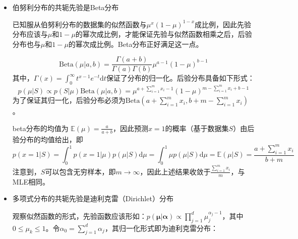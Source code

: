 \documentclass{article}
\begin{document}
	\begin{itemize}
	\item [\textbf{1}] 伯努利分布的共轭先验是Beta分布
	
	\vspace{1mm}
	\begin{scriptsize}
	\begin{spacing}{1.2}
	{\sffamily
	
	已知服从伯努利分布的数据集的似然函数与$\mu^x (1-\mu)^{1-x}$成比例，因此先验分布应该与$\mu$和$1-\mu$的幂次成比例，才能保证先验与似然函数相乘之后，后验分布也与$\mu$和$1-\mu$的幂次成比例。Beta分布正好满足这一点。
	
	\begin{equation}
	\mathrm{Beta}(\mu|a,b)=\frac{\Gamma(a+b)}{\Gamma(a)\Gamma(b)}\mu^{a-1}(1-\mu)^{b-1}
	\end{equation}
其中，$\Gamma(x)=\int^\infty_0 t^{x-1} e^{-t} \mathrm{d} t$保证了分布的归一化。后验分布具备如下形式： 
	\begin{equation*}
	p(\mu|S) \propto p(S|\mu) \mathrm{Beta}(\mu|a,b) = \mu^{a+\sum_{i=1}^m x_i-1}(1-\mu)^{m-\sum_{i=1}^m x_i + b-1}
	\end{equation*}
为了保证其归一化，后验分布必须为$\mathrm{Beta}(a+\sum_{i=1}^m x_i, b+m-\sum_{i=1}^m x_i)$。

    beta分布的均值为 $\mathbb{E}(\mu)=\frac{a}{a+b}$，因此预测$x=1$的概率（基于数据集$S$）由后验分布的均值给出，即
	\begin{equation*}
	p(x=1|S)=\int^1_0 p(x=1|\mu)p(\mu|S) \mathrm{d}\mu = \int^1_0 \mu p(\mu|S) \mathrm{d}\mu = \mathbb{E}(\mu|S) = \frac{a+\sum_{i=1}^m x_i}{b+m}
	\end{equation*}
注意到，$S$可以包含无穷样本，即$m\rightarrow\infty$，因此上述结果收敛于$\frac{\sum_{i=1}^m x_i}{m}$，与MLE相同。
	}
	\end{spacing}
	\end{scriptsize}
	\vspace{-2mm}
	
	\item [\textbf{2}] 多项式分布的共轭先验是迪利克雷（Dirichlet）分布

	\vspace{1mm}
	\begin{scriptsize}
	\begin{spacing}{1.2}
	{\sffamily
	观察似然函数的形式，先验函数应该形如：$p(\bm{\mu}|\bm{\alpha})\propto \prod_{j=1}^d \mu_j^{\alpha_j-1}$，其中$0\leq\mu_k\leq 1$。令$\alpha_0=\sum_{j=1}^d \alpha_j$，其归一化形式即为迪利克雷分布：
	
}
\end{spacing}
\end{scriptsize}
\end{itemize}
\end{document}
